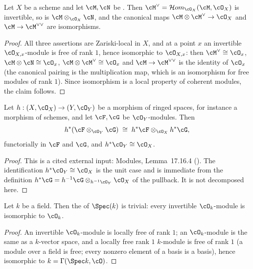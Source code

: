 \begin{lemma}
\label{lem:pc-tensor-dual-invertible}
Let $X$ be a scheme and let $\cM,\cN$ be
.  Then
$\cM^\vee=\mathcal{H}om_{\cO_X}(\cM,\cO_X)$ is invertible, so is
$\cM\otimes_{\cO_X}\cN$, and the canonical maps
$\cM\otimes\cM^\vee\to\cO_X$ and $\cM\to\cM^{\vee\vee}$ are
isomorphisms.
\end{lemma}
\begin{proof}
All three assertions are Zariski-local in $X$, and at a point $x$ an
invertible $\cO_{X,x}$-module is free of rank $1$, hence isomorphic to
$\cO_{X,x}$: then $\cM^\vee\cong\cO_x$, $\cM\otimes\cN\cong\cO_x$,
$\cM\otimes\cM^\vee\cong\cO_x$ and $\cM\to\cM^{\vee\vee}$ is the
identity of $\cO_x$ (the canonical pairing is the multiplication map,
which is an isomorphism for free modules of rank $1$).  Since
isomorphism is a local property of coherent modules, the claim follows.
\end{proof}

\begin{lemma}
\label{lem:pc-pullback-tensor}
Let $h:(X,\cO_X)\to(Y,\cO_Y)$ be a morphism of ringed spaces, for instance
a morphism of schemes, and let $\cF,\cG$ be $\cO_Y$-modules.  Then
\[
h^*(\cF\otimes_{\cO_Y}\cG)\;\cong\;h^*\cF\otimes_{\cO_X}h^*\cG,
\]
functorially in $\cF$ and $\cG$, and $h^*\cO_Y\cong\cO_X$.
\end{lemma}
\begin{proof}
This is a cited external input: Modules, Lemma~17.16.4
().  The identification $h^*\cO_Y\cong\cO_X$ is the
unit case and is immediate from the definition
$h^*\cG=h^{-1}\cG\otimes_{h^{-1}\cO_Y}\cO_X$ of the pullback.  It is not
decomposed here.
\end{proof}

\begin{lemma}\label{lem:pc-pic-of-field}
Let $k$ be a field.  Then the
 of $\Spec(k)$ is trivial:
every invertible $\cO_k$-module is isomorphic to $\cO_k$.
\end{lemma}
\begin{proof}
An invertible $\cO_k$-module is locally free of rank $1$; an $\cO_k$-module
is the same as a $k$-vector space, and a locally free rank $1$ $k$-module
is free of rank $1$ (a module over a field is free; every nonzero
element of a basis is a basis), hence isomorphic to $k=\Gamma(\Spec
k,\cO)$.
\end{proof}

